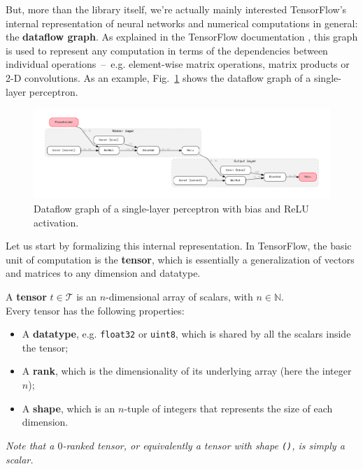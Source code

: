 \documentclass[11pt]{article}
\begin{document}
But, more than the library itself, we're actually mainly interested TensorFlow's internal representation of neural networks and numerical computations in general: the \textbf{dataflow graph}. As explained in the TensorFlow documentation \cite{tensorflow-doc-graph}, this graph is used to represent any computation in terms of the dependencies between individual operations~--~e.g. element-wise matrix operations, matrix products or 2-D convolutions. As an example, Fig.~\ref{fig-example-perceptron} shows the dataflow graph of a single-layer perceptron.

\bigskip
\begin{figure}[!h]
    \caption{Dataflow graph of a single-layer perceptron with bias and ReLU activation.}
    \label{fig-example-perceptron}
    \vspace{-1.5em}
    \hspace*{-6.4em}
    \includegraphics[width=1.3\textwidth]{example-perceptron.pdf}
    \vspace{-2em}
\end{figure}

Let us start by formalizing this internal representation. In TensorFlow, the basic unit of computation is the \textbf{tensor}, which is essentially a generalization of vectors and matrices to any dimension and datatype.\\

\begin{definition}
A \textbf{tensor} $t \in \mathcal{T}$ is an $n$-dimensional array of scalars, with $n \in \mathbb{N}$.\\

Every tensor has the following properties:
\begin{itemize}[noitemsep]
    \item A \textbf{datatype}, e.g. \texttt{float32} or \texttt{uint8}, which is shared by all the scalars inside the tensor;
    \item A \textbf{rank}, which is the dimensionality of its underlying array (here the integer $n$);
    \item A \textbf{shape}, which is an $n$-tuple of integers that represents the size of each dimension.
\end{itemize}

 \textit{Note that a $0$-ranked tensor, or equivalently a tensor with shape \texttt{()}, is simply a scalar.}\\
\end{definition}
\end{document}
